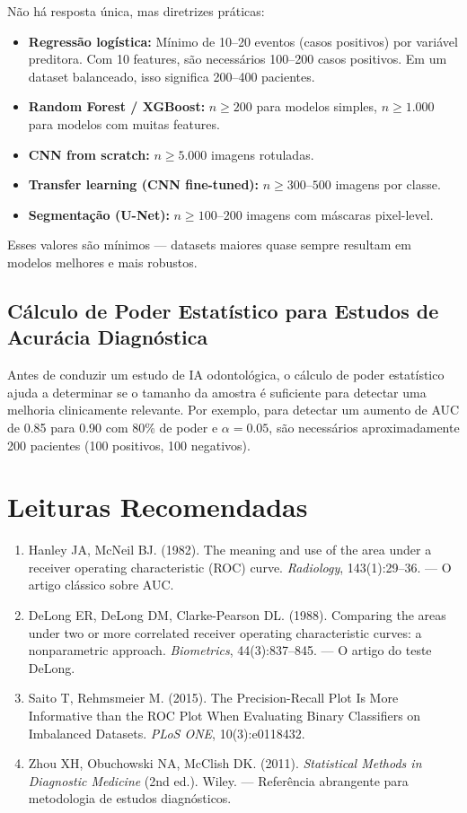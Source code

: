 Não há resposta única, mas diretrizes práticas:

\begin{itemize}
    \item \textbf{Regressão logística:} Mínimo de 10--20 eventos (casos positivos) por variável preditora. Com 10 features, são necessários 100--200 casos positivos. Em um dataset balanceado, isso significa 200--400 pacientes.
    \item \textbf{Random Forest / XGBoost:} $n \geq 200$ para modelos simples, $n \geq 1.000$ para modelos com muitas features.
    \item \textbf{CNN from scratch:} $n \geq 5.000$ imagens rotuladas.
    \item \textbf{Transfer learning (CNN fine-tuned):} $n \geq 300$--$500$ imagens por classe.
    \item \textbf{Segmentação (U-Net):} $n \geq 100$--$200$ imagens com máscaras pixel-level.
\end{itemize}

Esses valores são mínimos — datasets maiores quase sempre resultam em modelos melhores e mais robustos.

\subsection{Cálculo de Poder Estatístico para Estudos de Acurácia Diagnóstica}

Antes de conduzir um estudo de IA odontológica, o cálculo de poder estatístico ajuda a determinar se o tamanho da amostra é suficiente para detectar uma melhoria clinicamente relevante. Por exemplo, para detectar um aumento de AUC de 0.85 para 0.90 com 80\% de poder e $\alpha=0.05$, são necessários aproximadamente 200 pacientes (100 positivos, 100 negativos).

\section{Leituras Recomendadas}
\begin{enumerate}
    \item Hanley JA, McNeil BJ. (1982). The meaning and use of the area under a receiver operating characteristic (ROC) curve. \textit{Radiology}, 143(1):29--36. — O artigo clássico sobre AUC.
    \item DeLong ER, DeLong DM, Clarke-Pearson DL. (1988). Comparing the areas under two or more correlated receiver operating characteristic curves: a nonparametric approach. \textit{Biometrics}, 44(3):837--845. — O artigo do teste DeLong.
    \item Saito T, Rehmsmeier M. (2015). The Precision-Recall Plot Is More Informative than the ROC Plot When Evaluating Binary Classifiers on Imbalanced Datasets. \textit{PLoS ONE}, 10(3):e0118432.
    \item Zhou XH, Obuchowski NA, McClish DK. (2011). \textit{Statistical Methods in Diagnostic Medicine} (2nd ed.). Wiley. — Referência abrangente para metodologia de estudos diagnósticos.
\end{enumerate}

